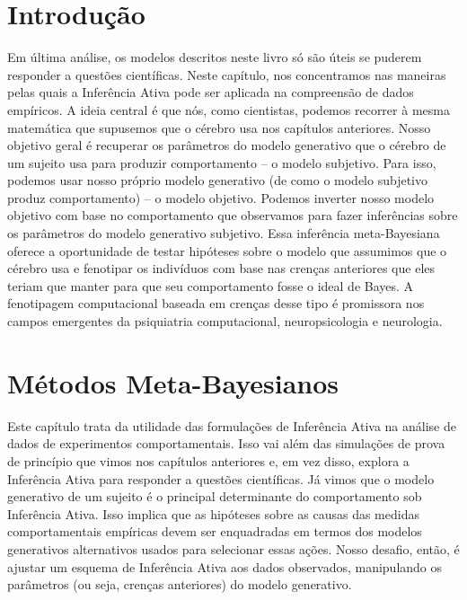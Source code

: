 \documentclass[
  12pt,
]{book}
\begin{document}
\hypertarget{introduuxe7uxe3o-8}{%
\section{Introdução}\label{introduuxe7uxe3o-8}}

Em última análise, os modelos descritos neste livro só são úteis se puderem responder a questões científicas. Neste capítulo, nos concentramos nas maneiras pelas quais a Inferência Ativa pode ser aplicada na compreensão de dados empíricos. A ideia central é que nós, como cientistas, podemos recorrer à mesma matemática que supusemos que o cérebro usa nos capítulos anteriores. Nosso objetivo geral é recuperar os parâmetros do modelo generativo que o cérebro de um sujeito usa para produzir comportamento -- o modelo subjetivo. Para isso, podemos usar nosso próprio modelo generativo (de como o modelo subjetivo produz comportamento) -- o modelo objetivo. Podemos inverter nosso modelo objetivo com base no comportamento que observamos para fazer inferências sobre os parâmetros do modelo generativo subjetivo. Essa inferência meta-Bayesiana oferece a oportunidade de testar hipóteses sobre o modelo que assumimos que o cérebro usa e fenotipar os indivíduos com base nas crenças anteriores que eles teriam que manter para que seu comportamento fosse o ideal de Bayes. A fenotipagem computacional baseada em crenças desse tipo é promissora nos campos emergentes da psiquiatria computacional, neuropsicologia e neurologia.

\hypertarget{muxe9todos-meta-bayesianos}{%
\section{Métodos Meta-Bayesianos}\label{muxe9todos-meta-bayesianos}}

Este capítulo trata da utilidade das formulações de Inferência Ativa na análise de dados de experimentos comportamentais. Isso vai além das simulações de prova de princípio que vimos nos capítulos anteriores e, em vez disso, explora a Inferência Ativa para responder a questões científicas. Já vimos que o modelo generativo de um sujeito é o principal determinante do comportamento sob Inferência Ativa. Isso implica que as hipóteses sobre as causas das medidas comportamentais empíricas devem ser enquadradas em termos dos modelos generativos alternativos usados para selecionar essas ações. Nosso desafio, então, é ajustar um esquema de Inferência Ativa aos dados observados, manipulando os parâmetros (ou seja, crenças anteriores) do modelo generativo.
\end{document}
